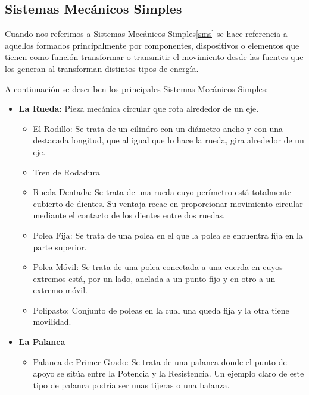  

\subsection{Sistemas Mecánicos Simples}

Cuando nos referimos a Sistemas Mecánicos Simples\ref{sms} se hace referencia a aquellos formados principalmente por componentes, dispositivos o elementos que tienen como función transformar o transmitir el movimiento desde las fuentes que los generan al transforman distintos tipos de energía.

A continuación se describen los principales Sistemas Mecánicos Simples:

\begin{itemize}

\item \textbf{La Rueda:} Pieza mecánica circular que rota alrededor de un eje.

\begin{itemize}
\item El Rodillo: Se trata de un cilindro con un diámetro ancho y con una destacada longitud, que al igual que lo hace la rueda, gira alrededor de un eje.

\item Tren de Rodadura
\item Rueda Dentada: Se trata de una rueda cuyo perímetro está totalmente cubierto de dientes. Su ventaja recae en proporcionar movimiento circular mediante el contacto de los dientes entre dos ruedas.

\item Polea Fija: Se trata de una polea en el que la polea se encuentra fija en la parte superior.

\item Polea Móvil: Se trata de una polea conectada a una cuerda en cuyos extremos está, por un lado, anclada a un punto fijo y en otro a un extremo móvil.

\item Polipasto: Conjunto de poleas en la cual una queda fija y la otra tiene movilidad.


\end{itemize}

\item \textbf{La Palanca} 

\begin{itemize}
\item Palanca de Primer Grado: Se trata de una palanca donde el punto de apoyo se sitúa entre la Potencia y la Resistencia. Un ejemplo claro de este tipo de palanca podría ser unas tijeras o una balanza.


\end{itemize}
\end{itemize}
